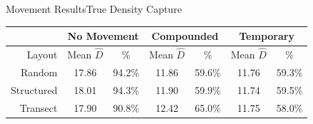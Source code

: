 \documentclass{beamer}
\begin{document}
\begin{frame}{Movement Results}{True Density Capture}
	\begin{table}
	
		\begin{tabular}{ r| c c| c c| c c|}
		
			& \multicolumn{2}{|c|}{No Movement}	& \multicolumn{2}{|c|}{Compounded}	& \multicolumn{2}{|c|}{Temporary}\\ 
	 \hline \hline
	
	 Layout		&\footnotesize Mean $\hat{D}$	&\footnotesize \%  &\footnotesize Mean $\hat{D}$ &\footnotesize \%  &\footnotesize Mean $\hat{D}$ &\footnotesize \% 	\\ \hline \hline
	 Random		& 17.86 			& 94.2\% 		& 11.86	& 59.6\%	& 11.76	& 59.3\% \\
	 Structured	& 18.01 			& 94.3\% 		& 11.90 & 59.9\% 	& 11.74 & 59.5\% \\
	 Transect	& 17.90 			& 90.8\% 		& 12.42 & 65.0\% 	& 11.75 & 58.0\% \\ \hline
	
		\end{tabular}
	
	\end{table}

\end{frame}
\end{document}
